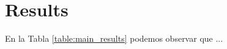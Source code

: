 \section{Results}
\label{section:results}


En la Tabla \ref{table:main_results} podemos observar que ...

\lipsum[4]

